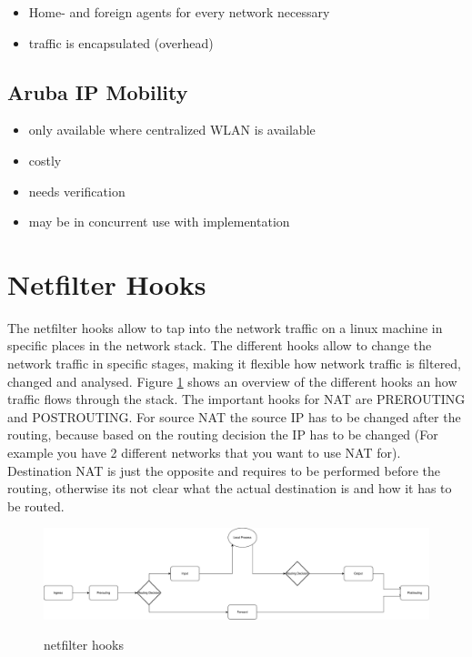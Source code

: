 \documentclass{report}
\begin{document}
\begin{itemize}
\itemsep1pt\parskip0pt
\item
  Home- and foreign agents for every network necessary
\item
  traffic is encapsulated (overhead)
\end{itemize}

\subsection{Aruba IP Mobility}\label{aruba-ip-mobility}

\begin{itemize}
\itemsep1pt\parskip0pt
\item
  only available where centralized WLAN is available
\item
  costly
\item
  needs verification
\item
  may be in concurrent use with implementation
\end{itemize}


\section{Netfilter Hooks}\label{netfilter-hooks}

The netfilter hooks\cite{hooks} allow to tap into the network traffic on a linux
machine in specific places in the network stack. The different hooks
allow to change the network traffic in specific stages, making it
flexible how network traffic is filtered, changed and analysed. Figure \ref{Hooks.pdf} shows an overview of the different hooks an how traffic flows
through the stack. The important hooks for NAT are PREROUTING and
POSTROUTING. For source NAT the source IP has to be changed after the
routing, because based on the routing decision the IP has to be changed
(For example you have 2 different networks that you want to use NAT
for). Destination NAT is just the opposite and requires to be performed
before the routing, otherwise its not clear what the actual destination
is and how it has to be routed.

\begin{figure}[ht]
	\centering
	\includegraphics[width=\textwidth]{../Hooks.pdf}
	\label{Hooks.pdf}
	\caption{netfilter hooks}  
\end{figure}
\end{document}
